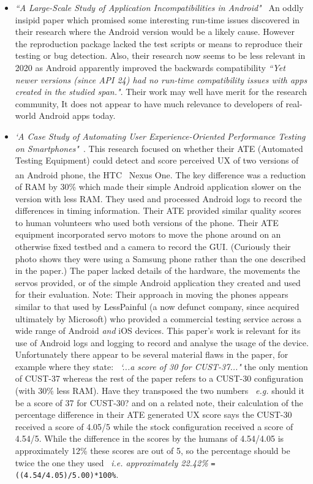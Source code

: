 \begin{itemize}
    \item \emph{``A Large-Scale Study of Application Incompatibilities in Android"}~\citep{cai2019_large_scale_study_of_android_incompatibilities} An oddly insipid paper which promised some interesting run-time issues discovered in their research where the Android version would be a likely cause. However the reproduction package lacked the test scripts or means to reproduce their testing or bug detection. Also, their research now seems to be less relevant in 2020 as Android apparently improved the backwards compatibility \emph{``Yet newer versions (since API 24) had no run-time compatibility issues with apps created in the studied span."}. Their work may well have merit for the research community, It does not appear to have much relevance to developers of real-world Android apps today.
    
    \item \emph{`A Case Study of Automating User Experience-Oriented Performance Testing on Smartphones"}~\citep{canfora2013_automating_UX_experience_testing_on_smartphones}. %
    This research focused on whether their ATE (Automated Testing Equipment) could detect and score perceived UX of two versions of an Android phone, the HTC~\textsuperscript{\textregistered} Nexus One. The key difference was a reduction of RAM by 30\% which made their simple Android application slower on the version with less RAM. They used and processed Android logs to record the differences in timing information. Their ATE provided similar quality scores to human volunteers who used both versions of the phone. Their ATE equipment incorporated servo motors to move the phone around on an otherwise fixed testbed and a camera to record the GUI. (Curiously their photo shows they were using a Samsung phone rather than the one described in the paper.) The paper lacked details of the hardware, the movements the servos provided, or of the simple Android application they created and used for their evaluation.
    Note: Their approach in moving the phones appears similar to that used by LessPainful (a now defunct company, since acquired ultimately by Microsoft) who provided a commercial testing service across a wide range of Android \textit{and} iOS devices. 
    This paper's work is relevant for its use of Android logs and logging to record and analyse the usage of the device. Unfortunately there appear to be several material flaws in the paper, for example where they state: ~\emph{`...a score of 30 for CUST-37..."} the only mention of CUST-37 whereas the rest of the paper refers to a CUST-30 configuration (with 30\% less RAM). Have they transposed the two numbers ~\emph{e.g.} should it be a score of 37 for CUST-30? and on a related note, their calculation of the percentage difference in their ATE generated UX score says the CUST-30 received a score of 4.05/5 while the stock configuration received a score of 4.54/5. While the difference in the scores by the humans of 4.54/4.05 is approximately 12\% these scores are out of 5, so the percentage should be twice the one they used ~\emph{i.e. approximately 22.42\%}  \texttt{=((4.54/4.05)/5.00)*100\%}.
    

\end{itemize}
